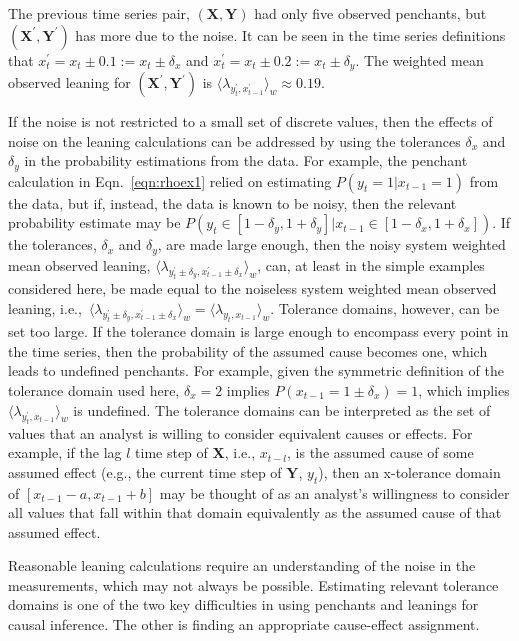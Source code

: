 The previous time series pair, $(\mathbf{X},\mathbf{Y})$ had only five observed penchants, but $(\mathbf{X}^\prime,\mathbf{Y}^\prime)$ has more due to the noise.  It can be seen in the time series definitions that $x_t^\prime = x_t \pm 0.1 := x_t \pm \delta_x$ and $x_t^\prime = x_t \pm 0.2 := x_t \pm \delta_y$.  The weighted mean observed leaning for $(\mathbf{X}^\prime,\mathbf{Y}^\prime)$ is $\langle \lambda_{y_t^\prime,x_{t-1}^\prime} \rangle_w \approx 0.19$. 

If the noise is not restricted to a small set of discrete values, then the effects of noise on the leaning calculations can be addressed by using the tolerances $\delta_x$ and $\delta_y$ in the probability estimations from the data.  For example, the penchant calculation in Eqn.\ \ref{eqn:rhoex1} relied on estimating $P(y_t=1|x_{t-1}=1)$ from the data, but if, instead, the data is known to be noisy, then the relevant probability estimate may be $P(y_t\in[1-\delta_y,1+\delta_y]|x_{t-1}\in[1-\delta_x,1+\delta_x])$.  If the tolerances, $\delta_x$ and $\delta_y$, are made large enough, then the noisy system weighted mean observed leaning, $\langle \lambda_{y_t^\prime\pm\delta_y,x_{t-1}^\prime\pm\delta_x} \rangle_w$, can, at least in the simple examples considered here, be made equal to the noiseless system weighted mean observed leaning, i.e.,\ $\langle \lambda_{y_t^\prime\pm\delta_y,x_{t-1}^\prime\pm\delta_x} \rangle_w = \langle \lambda_{y_t,x_{t-1}} \rangle_w$.  Tolerance domains, however, can be set too large.  If the tolerance domain is large enough to encompass every point in the time series, then the probability of the assumed cause becomes one, which leads to undefined penchants.  For example, given the symmetric definition of the tolerance domain used here, $\delta_x = 2$ implies $P(x_{t-1} = 1\pm\delta_x) = 1$, which implies $\langle \lambda_{y_t^\prime,x_{t-1}} \rangle_w$ is undefined.  The tolerance domains can be interpreted as the set of values that an analyst is willing to consider equivalent causes or effects.  For example, if the lag $l$ time step of $\mathbf{X}$, i.e., $x_{t-l}$, is the assumed cause of some assumed effect (e.g., the current time step of $\mathbf{Y}$, $y_t$), then an x-tolerance domain of $[x_{t-1}-a,x_{t-1}+b]$ may be thought of as an analyst's willingness to consider all values that fall within that domain equivalently as the assumed cause of that assumed effect.

Reasonable leaning calculations require an understanding of the noise in the measurements, which may not always be possible.  Estimating relevant tolerance domains is one of the two key difficulties in using penchants and leanings for causal inference.  The other is finding an appropriate cause-effect assignment.

